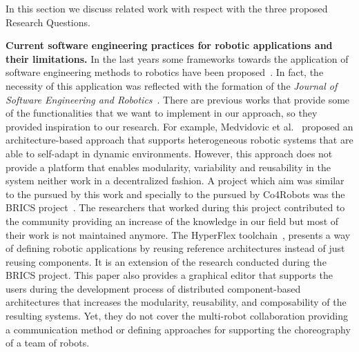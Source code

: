 In this section we discuss related work with respect with the three proposed Research Questions.

\textbf{Current software engineering practices for robotic applications and their limitations.}
In the last years some frameworks towards the application of software engineering methods to robotics have been proposed~\cite{Ramaswamy2014}.
In fact, the necessity of this application was reflected with the formation of the \emph{Journal of Software Engineering and Robotics}~\cite{Brugali2010_journal}.
There are previous works that provide some of the functionalities that we want to implement in our approach, so they provided inspiration to our research.
For example, Medvidovic et al.~\cite{medvidovic} proposed an architecture-based approach that supports heterogeneous robotic systems that are able to self-adapt in dynamic environments.
However, this approach does not provide a platform that enables modularity, variability and reusability in the system neither work in a decentralized fashion.
A project which aim was similar to the pursued by this work and specially to the pursued by Co4Robots was the BRICS project~\cite{Bischoff2010}. 
The researchers that worked during this project contributed to the community providing an increase of the knowledge in our field but most of their work is not maintained anymore.
The HyperFlex toolchain~\cite{gherardi}, presents a way of defining robotic applications by reusing reference architectures instead of just reusing components.
It is an extension of the research conducted during the BRICS project.
This paper also provides a graphical editor that supports the users during the development process of distributed component-based architectures that increases the modularity, reusability, and composability of the resulting systems.
Yet, they do not cover the multi-robot collaboration providing a communication method or defining approaches for supporting the choreography of a team of robots.

